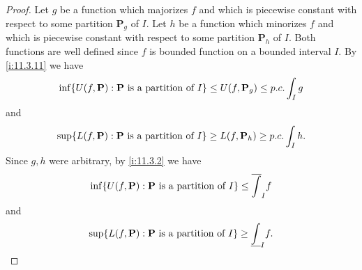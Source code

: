 \begin{proof}
  Let \(g\) be a function which majorizes \(f\) and which is piecewise constant with respect to some partition \(\mathbf{P}_g\) of \(I\).
  Let \(h\) be a function which minorizes \(f\) and which is piecewise constant with respect to some partition \(\mathbf{P}_h\) of \(I\).
  Both functions are well defined since \(f\) is bounded function on a bounded interval \(I\).
  By \cref{i:11.3.11} we have
  \[
    \inf\set{U(f, \mathbf{P}) : \mathbf{P} \text{ is a partition of } I} \leq U(f, \mathbf{P}_g) \leq p.c. \int_I g
  \]
  and
  \[
    \sup\set{L(f, \mathbf{P}) : \mathbf{P} \text{ is a partition of } I} \geq L(f, \mathbf{P}_h) \geq p.c. \int_I h.
  \]
  Since \(g, h\) were arbitrary, by \cref{i:11.3.2} we have
  \[
    \inf\set{U(f, \mathbf{P}) : \mathbf{P} \text{ is a partition of } I} \leq \overline{\int}_I f
  \]
  and
  \[
    \sup\set{L(f, \mathbf{P}) : \mathbf{P} \text{ is a partition of } I} \geq \underline{\int}_I f.
  \]


\end{proof}
